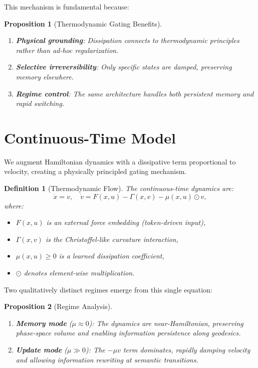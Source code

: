 \documentclass[12pt,letterpaper,twoside]{article}
\newtheorem{definition}{Definition}[section]
\newtheorem{prop}{Proposition}[section]
\begin{document}
This mechanism is fundamental because:

\begin{prop}[Thermodynamic Gating Benefits]
\begin{enumerate}
\item \textbf{Physical grounding}: Dissipation connects to thermodynamic principles rather than ad-hoc regularization.
\item \textbf{Selective irreversibility}: Only specific states are damped, preserving memory elsewhere.
\item \textbf{Regime control}: The same architecture handles both persistent memory and rapid switching.
\end{enumerate}
\end{prop}

\section{Continuous-Time Model}

We augment Hamiltonian dynamics with a dissipative term proportional to velocity, creating a physically principled gating mechanism.

\begin{definition}[Thermodynamic Flow]
The continuous-time dynamics are:
\[
\dot{x} = v, \quad \dot{v} = F(x,u) - \Gamma(x,v) - \mu(x,u) \odot v,
\]
where:
\begin{itemize}
\item $F(x,u)$ is an external force embedding (token-driven input),
\item $\Gamma(x,v)$ is the Christoffel-like curvature interaction,
\item $\mu(x,u) \geq 0$ is a learned dissipation coefficient,
\item $\odot$ denotes element-wise multiplication.
\end{itemize}
\end{definition}

Two qualitatively distinct regimes emerge from this single equation:

\begin{prop}[Regime Analysis]
\begin{enumerate}
\item \textbf{Memory mode} ($\mu \approx 0$): The dynamics are near-Hamiltonian, preserving phase-space volume and enabling information persistence along geodesics.
\item \textbf{Update mode} ($\mu \gg 0$): The $-\mu v$ term dominates, rapidly damping velocity and allowing information rewriting at semantic transitions.
\end{enumerate}
\end{prop}
\end{document}
